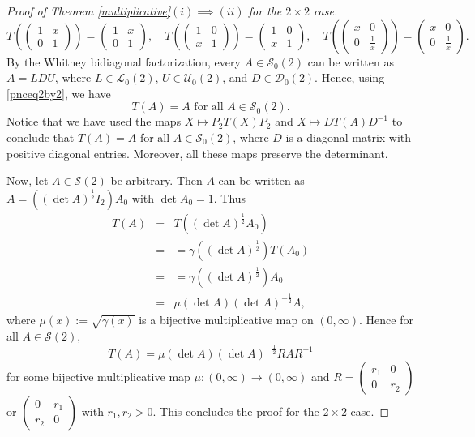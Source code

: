\documentclass[11pt,reqno]{amsart}
\theoremstyle{plain}
\theoremstyle{definition}
\numberwithin{equation}{section}
\def\cS{\mathcal S}
\def\cD{\mathcal D}
\def\cU{\mathcal U}
\def\cL{\mathcal L}
\begin{document}
\begin{proof}[Proof of Theorem \ref{multiplicative}$(i)\implies (ii)$ for the $2\times2$ case]
\begin{equation}\label{pnceq2by2}
 T\left(\begin{pmatrix}
	1 & x \\ 0 & 1
\end{pmatrix}\right)=\begin{pmatrix}
	1 & x \\ 0 & 1
\end{pmatrix},\quad T\left(\begin{pmatrix}
1 & 0 \\ x & 1
\end{pmatrix}\right)=\begin{pmatrix}
1 & 0 \\ x & 1
\end{pmatrix},\quad T\left(\begin{pmatrix}
x & 0 \\ 0 &\frac{1}{x}
\end{pmatrix}\right)=\begin{pmatrix}
x & 0 \\ 0 & \frac{1}{x}
\end{pmatrix}. \end{equation}
By the Whitney bidiagonal factorization, every $A\in\cS_0(2)$ can be written as $A=LDU$, where $L\in \cL_0(2)$, $U\in \cU_0(2)$, and $D\in \cD_0(2)$.  Hence, using \eqref{pnceq2by2}, we have
\[T(A)=A \text{ for all } A \in \cS_0(2).\]
 Notice that we have used the maps $X \mapsto P_2T(X)P_2$ and $X \mapsto DT(A)D^{-1}$ to conclude that $T(A)=A$ for all $A \in \cS_0(2)$, where $D$ is a diagonal matrix with positive diagonal entries. Moreover, all these maps preserve the determinant.

 Now, let $A \in \cS(2)$ be arbitrary. Then $A$ can be written as $A = ((\det A)^{\frac{1}{2}} I_2)A_0$ with $\det A_0 = 1$. Thus
	\begin{eqnarray*}
		T(A) &=& T((\det A)^{\frac{1}{2}} A_0)\\
		&=&= \gamma((\det A)^{\frac{1}{2}})  T(A_0)\\
		&=&= \gamma((\det A)^{\frac{1}{2}})  A_0\\
		&=&\mu(\det A)(\det A)^{-\frac{1}{2}} A ,
	\end{eqnarray*}
where $\mu(x):=\sqrt{\gamma(x)}$ is a bijective multiplicative map on $(0,\infty)$. Hence  for all $A\in\cS(2)$,
\[T(A)=\mu(\det A)(\det A)^{-\frac{1}{2}} RAR^{-1}\]
for some bijective  multiplicative map $\mu:(0,\infty) \to (0,\infty)$ and $R = \begin{pmatrix}
	r_1 & 0 \\ 0 & r_2
\end{pmatrix}$ or $\begin{pmatrix}
0 & r_1 \\ r_2 & 0
\end{pmatrix}$ with $r_1,r_2>0$. This concludes the proof for the $2 \times 2$ case.
\end{proof}
\end{document}
